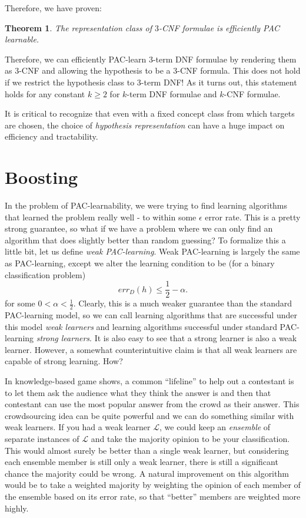 \documentclass{article}
\newtheorem{thm}{Theorem}
\newcommand{\LL}{\ensuremath{\mathcal{L}}}
\begin{document}
Therefore, we have proven:\\

\begin{framed}
\begin{thm}
    The representation class of $3$-CNF formulae is efficiently PAC learnable.
\end{thm}
\end{framed}

Therefore, we can efficiently PAC-learn 3-term DNF formulae by rendering them as
3-CNF and allowing the hypothesis to be a 3-CNF formula. This does not hold if
we restrict the hypothesis class to 3-term DNF! As it turns out, this statement
holds for any constant $k \geq 2$ for $k$-term DNF formulae and $k$-CNF formulae.

It is critical to recognize that even with a fixed concept class from which
targets are chosen, the choice of \emph{hypothesis representation} can have a
huge impact on efficiency and tractability.

\section{Boosting}
In the problem of PAC-learnability, we were trying to find learning algorithms
that learned the problem really well - to within some $\epsilon$ error rate.
This is a pretty strong guarantee, so what if we have a problem where we can
only find an algorithm that does slightly better than random guessing? To
formalize this a little bit, let us define \emph{weak PAC-learning}.
Weak PAC-learning is largely the same as PAC-learning, except we alter the
learning condition to be (for a binary classification problem)
\begin{equation*}
    err_D(h) \leq \frac{1}{2} - \alpha.
\end{equation*}
for some $0 < \alpha < \frac{1}{2}$. Clearly, this is a much weaker guarantee than
the standard PAC-learning model, so we can call learning algorithms that are
successful under this model \emph{weak learners} and learning algorithms
successful under standard PAC-learning \emph{strong learners}. It is also easy
to see that a strong learner is also a weak learner. However, a somewhat
counterintuitive claim is that all weak learners are capable of strong learning.
How?

In knowledge-based game shows, a common ``lifeline'' to help out a contestant
is to let them ask the audience what they think the answer is and then that
contestant can use the most popular answer from the crowd as their answer. This
crowdsourcing idea can be quite powerful and we can do something similar with
weak learners. If you had a weak learner $\LL$, we could keep an
\emph{ensemble} of separate instances of $\LL$ and take the majority opinion
to be your classification. This would almost surely be better than a single weak
learner, but considering each ensemble member is still only a weak learner,
there is still a significant chance the
majority could be wrong. A natural improvement on this algorithm would be to
take a weighted majority by weighting the opinion of each member of the ensemble
based on its error rate, so that ``better'' members are weighted more highly.
\end{document}
